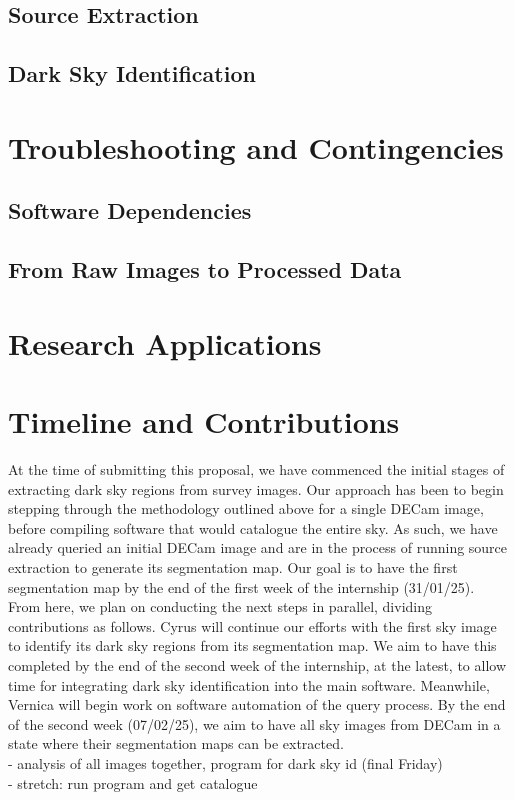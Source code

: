 \documentclass[11pt]{article}
\begin{document}
\subsection{Source Extraction}
\subsection{Dark Sky Identification}

\section{Troubleshooting and Contingencies}
\subsection{Software Dependencies}
\subsection{From Raw Images to Processed Data}

\section{Research Applications}

\section{Timeline and Contributions}
At the time of submitting this proposal, we have commenced the initial stages of extracting dark sky regions from survey images. Our approach has been to begin stepping through the methodology outlined above for a single DECam image, before compiling software that would catalogue the entire sky. As such, we have already queried an initial DECam image and are in the process of running source extraction to generate its segmentation map. Our goal is to have the first segmentation map by the end of the first week of the internship (31/01/25). \\

From here, we plan on conducting the next steps in parallel, dividing contributions as follows. Cyrus will continue our efforts with the first sky image to identify its dark sky regions from its segmentation map. We aim to have this completed by the end of the second week of the internship, at the latest, to allow time for integrating dark sky identification into the main software. Meanwhile, Vernica will begin work on software automation of the query process. By the end of the second week (07/02/25), we aim to have all sky images from DECam in a state where their segmentation maps can be extracted. \\

- analysis of all images together, program for dark sky id (final Friday) \\
- stretch: run program and get catalogue 

\printbibliography
\end{document}
